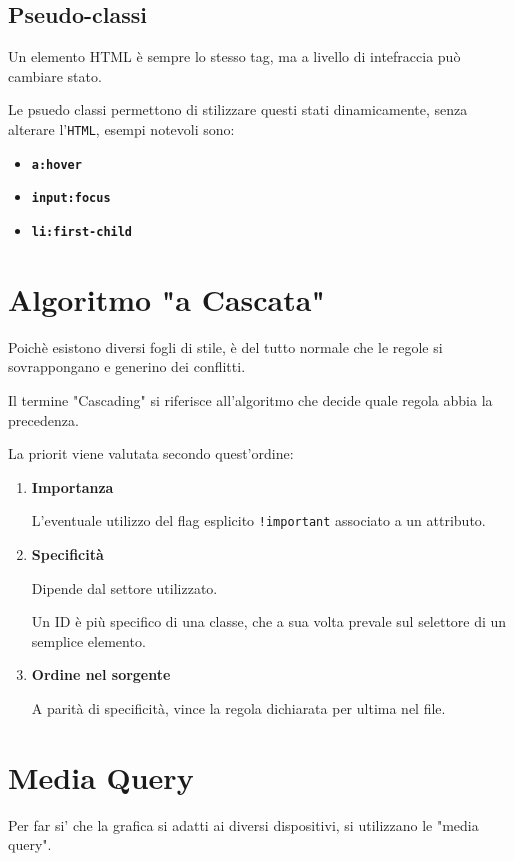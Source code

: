 \newpage

\subsection{Pseudo-classi}
Un elemento HTML è sempre lo stesso tag, ma a livello di intefraccia può cambiare stato.

Le psuedo classi permettono di stilizzare questi stati dinamicamente, senza alterare l'\texttt{HTML}, esempi notevoli sono:
\begin{itemize}
    \item \textbf{\texttt{a:hover}}
    \item \textbf{\texttt{input:focus}}
    \item \textbf{\texttt{li:first-child}}
\end{itemize}

\section{Algoritmo "a Cascata"}
Poichè esistono diversi fogli di stile, è del tutto normale che le regole si sovrappongano e generino dei conflitti.

Il termine "Cascading" si riferisce all'algoritmo che decide quale regola abbia la precedenza.

La priorit viene valutata secondo quest'ordine:
\begin{enumerate}
    \item \textbf{Importanza}
    
    L'eventuale utilizzo del flag esplicito \texttt{!important} associato a un attributo.
    
    \item \textbf{Specificità}

    Dipende dal settore utilizzato.

    Un ID è più specifico di una classe, che a sua volta prevale sul selettore di un semplice elemento.

    \item \textbf{Ordine nel sorgente}

    A parità di specificità, vince la regola dichiarata per ultima nel file.
\end{enumerate}

\section{Media Query}
Per far si' che la grafica si adatti ai diversi dispositivi, si utilizzano le "media query".

